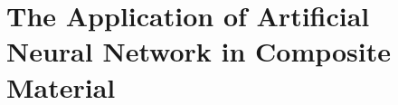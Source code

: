 
\chapter{The Application of Artificial Neural Network in Composite Material} %

\label{Chapter4} %




%



%
%


